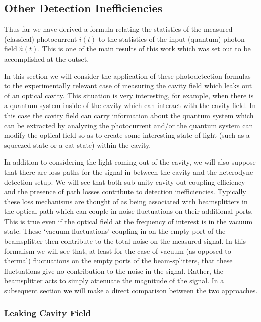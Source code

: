 \documentclass[12pt]{article}
\begin{document}
\subsection{Other Detection Inefficiencies}

Thus far we have derived a formula relating the statistics of the measured (classical) photocurrent $i(t)$ to the statistics of the input (quantum) photon field $\hat{a}(t)$. This is one of the main results of this work which was set out to be accomplished at the outset.

In this section we will consider the application of these photodetection formulas to the experimentally relevant case of measuring the cavity field which leaks out of an optical cavity. This situation is very interesting, for example, when there is a quantum system inside of the cavity which can interact with the cavity field. In this case the cavity field can carry information about the quantum system which can be extracted by analyzing the photocurrent and/or the quantum system can modify the optical field so as to create some interesting state of light (such as a squeezed state or a cat state) within the cavity.

In addition to considering the light coming out of the cavity, we will also suppose that there are loss paths for the signal in between the cavity and the heterodyne detection setup. We will see that both sub-unity cavity out-coupling efficiency and the presence of path losses contribute to detection inefficiencies. Typically these loss mechanisms are thought of as being associated with beamsplitters in the optical path which can couple in noise fluctuations on their additional ports. This is true even if the optical field at the frequency of interest is in the vacuum state. These `vacuum fluctuations' coupling in on the empty port of the beamsplitter then contribute to the total noise on the measured signal. In this formalism we will see that, at least for the case of vacuum (as opposed to thermal) fluctuations on the empty ports of the beam-splitters, that these fluctuations give no contribution to the noise in the signal. Rather, the beamsplitter acts to simply attenuate the magnitude of the signal. In a subsequent section we will make a direct comparison between the two approaches.

\subsubsection{Leaking Cavity Field}
\end{document}
